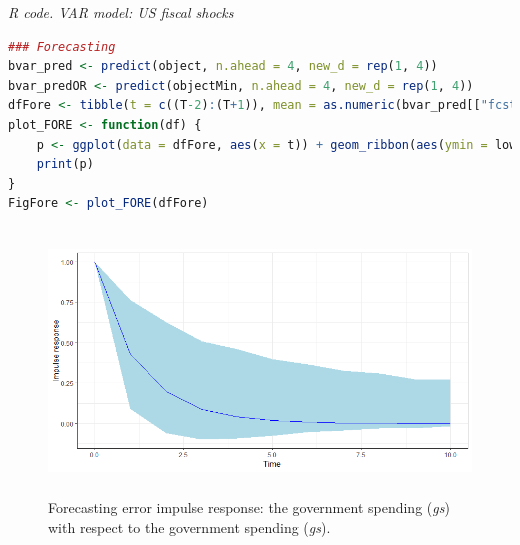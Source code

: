 \begin{tcolorbox}[enhanced,width=4.67in,center upper,
	fontupper=\large\bfseries,drop shadow southwest,sharp corners]
	\textit{R code. VAR model: US fiscal shocks}
	\begin{VF}
		\begin{lstlisting}[language=R]
### Forecasting
bvar_pred <- predict(object, n.ahead = 4, new_d = rep(1, 4))
bvar_predOR <- predict(objectMin, n.ahead = 4, new_d = rep(1, 4))
dfFore <- tibble(t = c((T-2):(T+1)), mean = as.numeric(bvar_pred[["fcst"]][["gs"]][,2]), lower = as.numeric(bvar_pred[["fcst"]][["gs"]][,1]), upper = as.numeric(bvar_pred[["fcst"]][["gs"]][,3]), mean1 = as.numeric(bvar_predOR[["fcst"]][["gs"]][,2]), lower1 = as.numeric(bvar_predOR[["fcst"]][["gs"]][,1]), upper1 = as.numeric(bvar_predOR[["fcst"]][["gs"]][,3]), true = as.numeric(Y[c((T-2):(T+1)),2]))
plot_FORE <- function(df) {
	p <- ggplot(data = dfFore, aes(x = t)) + geom_ribbon(aes(ymin = lower1, ymax = upper1), alpha = 1, fill = "blue") + geom_ribbon(aes(ymin = lower, ymax = upper), alpha = 1, fill = "lightblue") + geom_line(aes(y = mean), colour = "green", linewidth = 0.5) + geom_line(aes(y = mean1), colour = "red", linewidth = 0.5) + geom_line(aes(y = true), colour = "black", linewidth = 0.5) + ylab("Forecast") + xlab("Time") + xlim(c((T-2),(T+1)))
	print(p)
}
FigFore <- plot_FORE(dfFore)
\end{lstlisting}
	\end{VF}
\end{tcolorbox} 


\begin{figure}[!h]
	\includegraphics[width=340pt, height=200pt]{Chapters/chapter8/figures/IRsgsgFE.png}
	\caption[List of figure caption goes here]{Forecasting error impulse response: the government spending (\textit{gs}) with respect to the government spending (\textit{gs}).}\label{fig6}
\end{figure}

